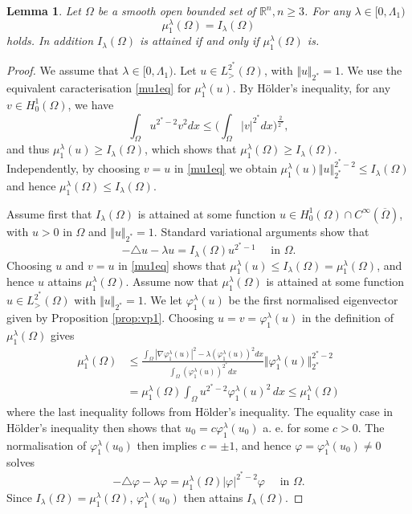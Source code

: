\documentclass[10pt]{amsart}
\numberwithin{equation}{section}
\newcommand{\R}{\mathbb{R}}
\newcommand{\vp}{\varphi}
\newcommand{\Om}{\Omega}
\newcommand{\bal}{\begin{aligned}}
\newcommand{\eal}{\end{aligned}}
\theoremstyle{plain}
\newtheorem{lemme}{Lemma}[section]%
\theoremstyle{remark}
\begin{document}
\begin{lemme} \label{lemme:muI}
Let $\Om$ be a smooth open bounded set of $\R^n, n \ge 3$. For any $\lambda \in [0, \Lambda_1)$
\begin{equation*}
\mu_1^{\lambda}(\Om) = I_\lambda(\Om)
\end{equation*}
holds. In addition $I_\lambda(\Om)$ is attained if and only if $\mu_1^{\lambda}(\Om)$ is. 
\end{lemme}
\begin{proof}
We assume that $\lambda \in [0, \Lambda_1)$. Let $u \in L^{2^*}_{>}(\Om)$, with $\Vert u \Vert_{2^*} = 1$. We use the equivalent caracterisation \eqref{mu1eq} for $\mu_1^{\lambda}(u)$. By H\"older's inequality, for any $v \in H^1_0(\Om)$, we have
$$ \int_{\Om} u^{2^*-2}v^2dx \le \Big(\int_{\Om} |v|^{2^*}dx \Big)^{\frac{2}{2^*}},$$
and thus $\mu_1^{\lambda}(u) \ge I_\lambda(\Om)$, which shows that $\mu_1^{\lambda}(\Om) \ge I_\lambda(\Om)$. Independently, by choosing $v = u$ in \eqref{mu1eq} we obtain $\mu_1^\lambda(u) \Vert u \Vert_{2^*}^{2^*-2} \le I_\lambda(\Om)$ and hence $\mu_1^{\lambda}(\Om) \le I_\lambda(\Om)$.

Assume first that $I_\lambda(\Om)$ is attained at some function $u \in H^1_0(\Om) \cap C^\infty(\overline{\Om})$, with $u >0$ in $\Om$ and $\Vert u \Vert_{2^*}=1$. Standard variational arguments show that 
$$ - \triangle u - \lambda u = I_\lambda(\Om) u^{2^*-1} \quad \text{ in } \Om. $$
Choosing $u$ and $v = u$ in \eqref{mu1eq} shows that $\mu_1^{\lambda}(u) \le I_\lambda(\Om)= \mu_1^{\lambda}(\Om)$, and hence $u$ attains $\mu_1^{\lambda}(\Om)$. Assume now that $\mu_1^\lambda(\Om)$ is attained at some function $u \in L^{2^*}_{>}(\Om)$ with $\Vert u\Vert_{2^*}=1$. We let $\vp_1^{\lambda}(u)$ be the first normalised eigenvector given by Proposition \ref{prop:vp1}. Choosing $u = v = \vp_1^{\lambda}(u)$ in the definition of $\mu_1^\lambda(\Om)$ gives
$$ \bal
\mu_1^{\lambda}(\Om) & \le \frac{\int_\Om |\nabla \vp_1^{\lambda}(u)|^2 - \lambda (\vp_1^{\lambda}(u))^2 dx }{\int_{\Om} ( \vp_1^{\lambda}(u))^{2^*}dx} \Vert \vp_1^{\lambda}(u) \Vert_{2^*}^{2^*-2} \\
& = \mu_1^{\lambda}(\Om) \int_{\Om} u^{2^*-2}  \vp_1^{\lambda}(u)^2 \, dx \le  \mu_1^{\lambda}(\Om)
\eal $$
where the last inequality follows from H\"older's inequality. The equality case in H\"older's inequality then shows that $u_0 = c \vp_1^{\lambda}(u_0)$ a. e. for some $c >0$. The normalisation of $\vp_1^{\lambda}(u_0)$ then implies $c=\pm1$, and hence $ \vp = \vp_{1}^\lambda(u_0) \neq 0$ solves
$$ - \triangle \vp - \lambda \vp  = \mu_1^{\lambda}(\Om) |\vp|^{2^*-2} \vp \quad \text{ in } \Om. $$
Since $I_\lambda(\Om) = \mu_1^{\lambda}(\Om)$, $\vp_1^{\lambda}(u_0)$ then attains $I_\lambda(\Om)$. 
\end{proof}
\end{document}
